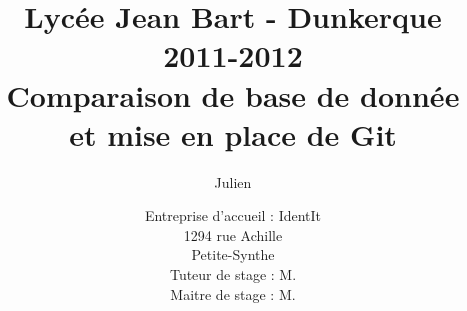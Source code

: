 \documentclass[12pt,a4paper,draft]{report}
\title
{
	\normalsize{Lycée Jean Bart - Dunkerque\\
	2011-2012}\\
	\vspace{15mm}
	\Huge{Comparaison de base de donnée\\
    et mise en place de Git\\
    \vspace{15mm}}
}
\author{\bsc{Stechele} Julien\\
	\vspace{45mm}
}
\date{
	\normalsize{Entreprise d'accueil : IdentIt\\
    1294 rue Achille \bsc{Pérès}\\
	Petite-Synthe\\
	\vspace{5mm}
    Tuteur de stage : M.\bsc{Anselin}\\
	Maitre de stage : M.\bsc{Dubourg}
	}
}
\begin{document}
\maketitle

\begin{onehalfspace}



\renewcommand{\contentsname}{Sommaire}

\tableofcontents









\end{onehalfspace}
\end{document}
